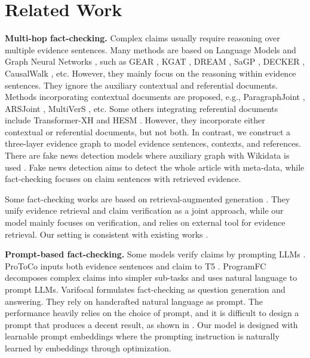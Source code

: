 \section{Related Work}

\textbf{Multi-hop fact-checking.} Complex claims usually require reasoning over multiple evidence sentences. Many methods are based on Language Models \cite{transformer,bert} and Graph Neural Networks \cite{graphsage}, such as GEAR \cite{gear}, KGAT \cite{kgat}, DREAM \cite{dream}, SaGP \cite{sagp}, DECKER \cite{decker}, CausalWalk \cite{causalwalk}, etc. However, they mainly focus on the reasoning within evidence sentences. They ignore the auxiliary contextual and referential documents. Methods incorporating contextual documents are proposed, e.g., ParagraphJoint \cite{paragraphjoint}, ARSJoint \cite{arsjoint}, MultiVerS \cite{multivers}, etc. Some others integrating referential documents include Transformer-XH \cite{transformer_xh} and HESM \cite{hesm}. However, they incorporate either contextual or referential documents, but not both. In contrast, we construct a three-layer evidence graph to model evidence sentences, contexts, and references. There are fake news detection models where auxiliary graph with Wikidata is used \cite{fake_news_detection,fake_news_detection2}. Fake news detection aims to detect the whole article with meta-data, while fact-checking focuses on claim sentences with retrieved evidence.

Some fact-checking works are based on retrieval-augmented generation \cite{justilm}. They unify evidence retrieval and claim verification as a joint approach, while our model mainly focuses on verification, and relies on external tool for evidence retrieval. Our setting is consistent with existing works \cite{multivers,causalwalk}.

\textbf{Prompt-based fact-checking.} Some models verify claims by prompting LLMs \cite{gpt4}. ProToCo \cite{protoco} inputs both evidence sentences and claim to T5 \cite{t5}. ProgramFC \cite{programfc} decomposes complex claims into simpler sub-tasks and uses natural language to prompt LLMs. Varifocal \cite{varifocal} formulates fact-checking as question generation and answering. They rely on handcrafted natural language as prompt. The performance heavily relies on the choice of prompt, and it is difficult to design a prompt that produces a decent result, as shown in \cite{coop}. Our model is designed with learnable prompt embeddings where the prompting instruction is naturally learned by embeddings through optimization.

